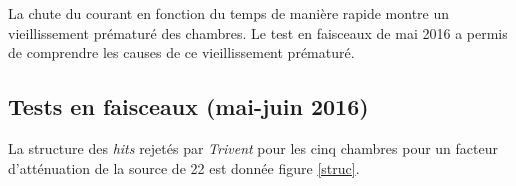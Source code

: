La chute du courant en fonction du temps de manière rapide montre un vieillissement prématuré des chambres. Le test en faisceaux de mai 2016 a permis de comprendre les causes de ce vieillissement prématuré.

\subsection{Tests en faisceaux (mai-juin 2016)}
\label{GIFFF2}
La structure des \textit{hits} rejetés par \textit{Trivent} pour les cinq chambres pour un facteur d'atténuation de la source de \num{22} est donnée figure \ref{struc}.
\begin{figure}[ht!]
	\centering
	\hfill
	\\
	\vspace{0.7cm}
	\hfill

\end{figure}

